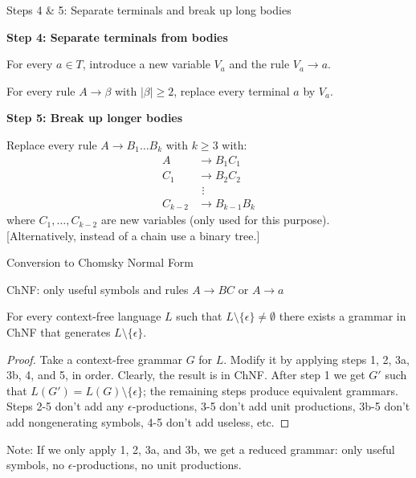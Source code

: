 \documentclass[handout]{beamer}
\begin{document}
\begin{frame}{Steps 4 \& 5: Separate terminals and break up long bodies}

	\textbf{Step 4: Separate terminals from bodies}

	For every $a\in T$, introduce a new variable $V_a$ and the rule $V_a\to a$.

	For every rule $A\to\beta$ with $|\beta|\geq 2$, replace every terminal $a$ by $V_a$.
	
	\bigskip

	\textbf{Step 5: Break up longer bodies}

	Replace every rule $A\to B_1\dots B_k$ with $k\geq 3$ with:
	\begin{align*}
		A&\to B_1 C_1\\
		C_1&\to B_2 C_2\\
		&\ \,\vdots\\
		C_{k-2}&\to B_{k-1}B_k
	\end{align*}
	where $C_1,\dots,C_{k-2}$ are new variables (only used for this purpose).\\ 
	{[Alternatively, instead of a chain use a binary tree.]}
	
\end{frame}


\begin{frame}{Conversion to Chomsky Normal Form}

	ChNF: only useful symbols and rules \alert{$A\to BC$} or \alert{$A\to a$}
	
	\begin{theorem}
		For every context-free language $L$ such that $L\setminus \{\epsilon\}\neq \emptyset$ there exists a grammar in ChNF that generates $L\setminus \{\epsilon\}$.
	\end{theorem}
	\begin{proof}
		Take a context-free grammar $G$ for $L$. Modify it by applying steps 1, 2, 3a, 3b, 4, and 5, in order. Clearly, the result is in ChNF. After step 1 we get $G'$ such that $L(G')=L(G)\setminus \{\epsilon\}$; the remaining steps produce equivalent grammars. Steps 2-5 don't add any $\epsilon$-productions, 3-5 don't add unit productions, 3b-5 don't add nongenerating symbols, 4-5 don't add useless, etc.
	\end{proof}

	Note: If we only apply 1, 2, 3a, and 3b, we get a \alert{reduced} grammar: only useful symbols, no $\epsilon$-productions, no unit productions.

\end{frame}
\end{document}
